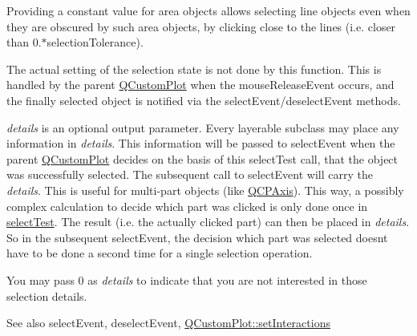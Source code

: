 Providing a constant value for area objects allows selecting line objects even when they are obscured by such area objects, by clicking close to the lines (i.\+e. closer than 0.$\ast$selection\+Tolerance).

The actual setting of the selection state is not done by this function. This is handled by the parent \hyperlink{class_q_custom_plot}{Q\+Custom\+Plot} when the mouse\+Release\+Event occurs, and the finally selected object is notified via the select\+Event/deselect\+Event methods.

{\itshape details} is an optional output parameter. Every layerable subclass may place any information in {\itshape details}. This information will be passed to select\+Event when the parent \hyperlink{class_q_custom_plot}{Q\+Custom\+Plot} decides on the basis of this select\+Test call, that the object was successfully selected. The subsequent call to select\+Event will carry the {\itshape details}. This is useful for multi-\/part objects (like \hyperlink{class_q_c_p_axis}{Q\+C\+P\+Axis}). This way, a possibly complex calculation to decide which part was clicked is only done once in \hyperlink{class_q_c_p_layerable_a04db8351fefd44cfdb77958e75c6288e}{select\+Test}. The result (i.\+e. the actually clicked part) can then be placed in {\itshape details}. So in the subsequent select\+Event, the decision which part was selected doesn\textquotesingle{}t have to be done a second time for a single selection operation.

You may pass 0 as {\itshape details} to indicate that you are not interested in those selection details.

\begin{DoxySeeAlso}{See also}
select\+Event, deselect\+Event, \hyperlink{class_q_custom_plot_a5ee1e2f6ae27419deca53e75907c27e5}{Q\+Custom\+Plot\+::set\+Interactions} 
\end{DoxySeeAlso}


